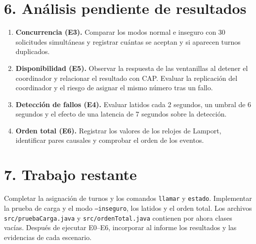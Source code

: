 \documentclass[11pt,a4paper]{article}
\begin{document}
\section*{6. Análisis pendiente de resultados}
\begin{enumerate}[leftmargin=*]
\item \textbf{Concurrencia (E3).} Comparar los modos normal e inseguro con 30 solicitudes simultáneas y registrar cuántas se aceptan y si aparecen turnos duplicados.
\item \textbf{Disponibilidad (E5).} Observar la respuesta de las ventanillas al detener el coordinador y relacionar el resultado con CAP. Evaluar la replicación del coordinador y el riesgo de asignar el mismo número tras un fallo.
\item \textbf{Detección de fallos (E4).} Evaluar latidos cada 2 segundos, un umbral de 6 segundos y el efecto de una latencia de 7 segundos sobre la detección.
\item \textbf{Orden total (E6).} Registrar los valores de los relojes de Lamport, identificar pares causales y comprobar el orden de los eventos.
\end{enumerate}

\section*{7. Trabajo restante}
Completar la asignación de turnos y los comandos \texttt{llamar} y \texttt{estado}. Implementar la prueba de carga y el modo \texttt{--inseguro}, los latidos y el orden total. Los archivos \texttt{src/pruebaCarga.java} y \texttt{src/ordenTotal.java} contienen por ahora clases vacías. Después de ejecutar E0--E6, incorporar al informe los resultados y las evidencias de cada escenario.
\end{document}
